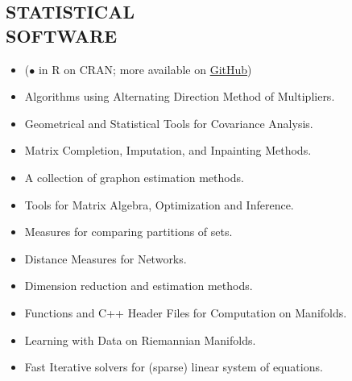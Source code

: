 \documentclass[margin, 10pt]{res} %
\begin{document}
\begin{resume}
\section{\sf STATISTICAL\\ SOFTWARE} 

\begin{itemize} \itemsep -1pt
	\item[]($\bullet$ in R on CRAN; more available on \href{http://github.com/kyoustat}{GitHub})
    \item{ Algorithms using Alternating Direction Method of Multipliers.}
    \item{  Geometrical and Statistical Tools for Covariance Analysis.}
    \item{  Matrix Completion, Imputation, and Inpainting Methods.}
    \item{ A collection of graphon estimation methods.}
    \item{  Tools for Matrix Algebra, Optimization and Inference.}
    \item{  Measures for comparing partitions of sets.}
    \item{  Distance Measures for Networks.}
    \item{  Dimension reduction and estimation methods.}
    \item{ Functions and C++ Header Files for Computation on Manifolds.}
    \item{ Learning with Data on Riemannian Manifolds.}
    \item{ Fast Iterative solvers for (sparse) linear system of equations.}

\end{itemize}
\end{resume}
\end{document}
